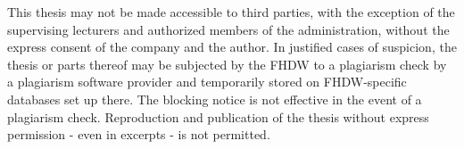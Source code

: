 

This thesis may not be made accessible to third parties, with the exception of the supervising lecturers and authorized members of the administration, without the express consent of the company and the author.
In justified cases of suspicion, the thesis or parts thereof may be subjected by the FHDW to a plagiarism check by a plagiarism software provider and temporarily stored on FHDW-specific databases set up there.
The blocking notice is not effective in the event of a plagiarism check.
Reproduction and publication of the thesis without express permission - even in excerpts - is not permitted.
